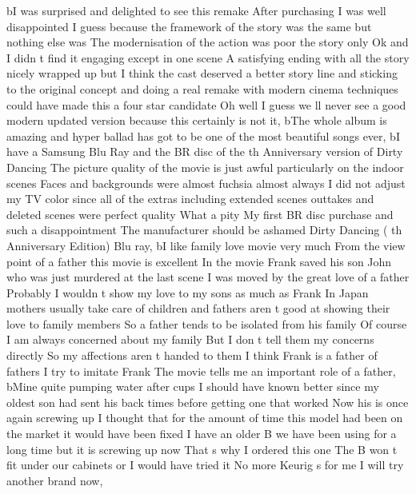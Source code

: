 \documentclass[
]{article}
\newenvironment{Shaded}{}{}
\newcommand{\NormalTok}[1]{#1}
\newcommand{\StringTok}[1]{\textcolor[rgb]{0.25,0.44,0.63}{#1}}
\begin{document}
\begin{Shaded}
\begin{Highlighting}[]
\NormalTok{       b}\StringTok{\textquotesingle{}I was surprised and delighted to see this remake After purchasing I was well disappointed I guess because the framework of the story was the same but nothing else was The modernisation of the action was poor the story only Ok and I didn t find it engaging except in one scene A satisfying ending with all the story nicely wrapped up but I think the cast deserved a better story line and sticking to the original concept and doing a real remake with modern cinema techniques could have made this a four star candidate Oh well I guess we ll never see a good modern updated version because this certainly is not it\textquotesingle{}}\NormalTok{,}
\NormalTok{       b}\StringTok{\textquotesingle{}The whole album is amazing and hyper ballad has got to be one of the most beautiful songs ever\textquotesingle{}}\NormalTok{,}
\NormalTok{       b}\StringTok{\textquotesingle{}I have a Samsung Blu Ray and the BR disc of the th Anniversary version of Dirty Dancing The picture quality of the movie is just awful particularly on the indoor scenes Faces and backgrounds were almost fuchsia almost always I did not adjust my TV color since all of the extras including extended scenes outtakes and deleted scenes were perfect quality What a pity My first BR disc purchase and such a disappointment The manufacturer should be ashamed Dirty Dancing ( th Anniversary Edition) Blu ray\textquotesingle{}}\NormalTok{,}
\NormalTok{       b}\StringTok{\textquotesingle{}I like family love movie very much From the view point of a father this movie is excellent In the movie Frank saved his son John who was just murdered at the last scene I was moved by the great love of a father Probably I wouldn t show my love to my sons as much as Frank In Japan mothers usually take care of children and fathers aren t good at showing their love to family members So a father tends to be isolated from his family Of course I am always concerned about my family But I don t tell them my concerns directly So my affections aren t handed to them I think Frank is a father of fathers I try to imitate Frank The movie tells me an important role of a father\textquotesingle{}}\NormalTok{,}
\NormalTok{       b}\StringTok{\textquotesingle{}Mine quite pumping water after cups I should have known better since my oldest son had sent his back times before getting one that worked Now his is once again screwing up I thought that for the amount of time this model had been on the market it would have been fixed I have an older B we have been using for a long time but it is screwing up now That s why I ordered this one The B won t fit under our cabinets or I would have tried it No more Keurig s for me I will try another brand now\textquotesingle{}}\NormalTok{,}

\end{Highlighting}
\end{Shaded}
\end{document}
